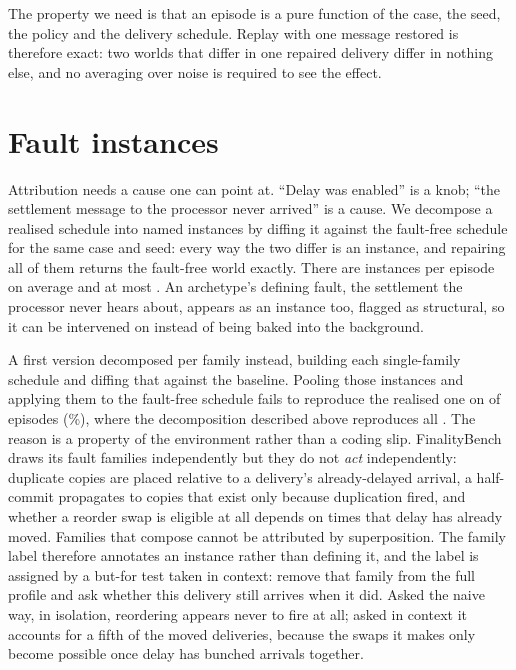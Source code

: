 \documentclass[conference]{IEEEtran}
\begin{document}
The property we need is that an episode is a pure function of the case, the
seed, the policy and the delivery schedule. Replay with one message restored is
therefore exact: two worlds that differ in one repaired delivery differ in
nothing else, and no averaging over noise is required to see the effect.

\section{Fault instances}
\label{sec:faults}

Attribution needs a cause one can point at. ``Delay was enabled'' is a knob;
``the settlement message to the processor never arrived'' is a cause. We
decompose a realised schedule into named instances by diffing it against the
fault-free schedule for the same case and seed: every way the two differ is an
instance, and repairing all of them returns the fault-free world exactly. There
are \meanInstances{} instances per episode on average and at most
\maxInstances. An archetype's defining fault, the settlement the processor
never hears about, appears as an instance too, flagged as structural, so it can be intervened on instead of being baked into the background.

A first version decomposed per family instead, building each single-family
schedule and diffing that against the baseline. Pooling those instances and
applying them to the fault-free schedule fails to reproduce the realised one on
\superFailed{} of \superEpisodes{} episodes (\superFailRate\%), where the
decomposition described above reproduces all \superCurrentOk{}. The reason is
a property of the environment rather than a coding slip. FinalityBench draws its fault families
independently but they do not \emph{act} independently: duplicate copies are
placed relative to a delivery's already-delayed arrival, a half-commit
propagates to copies that exist only because duplication fired, and whether a
reorder swap is eligible at all depends on times that delay has already moved.
Families that compose cannot be attributed by superposition. The family label
therefore annotates an instance rather than defining it, and the label is assigned by a but-for test taken in context: remove that
family from the full profile and ask whether this delivery still arrives when
it did. Asked the
naive way, in isolation, reordering appears never to fire at all; asked in
context it accounts for a fifth of the moved deliveries, because the swaps it
makes only become possible once delay has bunched arrivals together.
\end{document}
